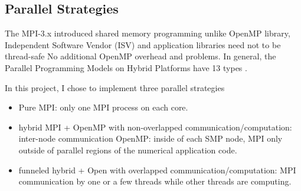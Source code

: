 \subsection{Parallel Strategies}
The MPI-3.x introduced shared memory programming unlike OpenMP library, 
Independent Software Vendor (ISV) and application libraries need not to be thread-safe
No additional OpenMP overhead and problems. 
In general, the Parallel Programming Models on Hybrid Platforms have 13 types
                                              \cite{SUPERsmith}.

  
    
    


In this project, I chose to implement three parallel strategies
\begin{itemize}
  \item Pure MPI: only one MPI process on each core.
  \item hybrid MPI + OpenMP with non-overlapped communication/computation:
                          inter-node communication OpenMP: inside of each SMP node, 
                          MPI only outside of parallel regions of the numerical application code.
  \item funneled hybrid + Open with overlapped communication/computation: 
                          MPI communication by one or a few threads while other threads are computing.
\end{itemize}

